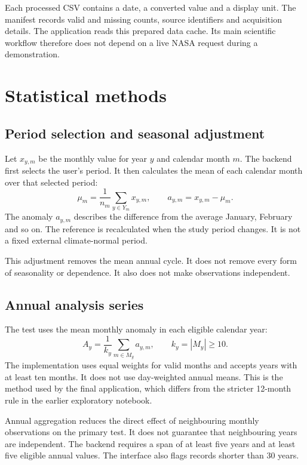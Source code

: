 \documentclass[10pt,a4paper,twocolumn]{article}
\begin{document}
Each processed CSV contains a date, a converted value and a display unit. The manifest records valid and missing counts, source identifiers and acquisition details. The application reads this prepared data cache. Its main scientific workflow therefore does not depend on a live NASA request during a demonstration.

\section{Statistical methods}
\subsection{Period selection and seasonal adjustment}
Let $x_{y,m}$ be the monthly value for year $y$ and calendar month $m$. The backend first selects the user's period. It then calculates the mean of each calendar month over that selected period:
\begin{equation}
\mu_m=\frac{1}{n_m}\sum_{y\in Y_m}x_{y,m},
\qquad a_{y,m}=x_{y,m}-\mu_m.
\label{eq:anomaly}
\end{equation}
The anomaly $a_{y,m}$ describes the difference from the average January, February and so on. The reference is recalculated when the study period changes. It is not a fixed external climate-normal period.

This adjustment removes the mean annual cycle. It does not remove every form of seasonality or dependence. It also does not make observations independent.

\subsection{Annual analysis series}
The test uses the mean monthly anomaly in each eligible calendar year:
\begin{equation}
A_y=\frac{1}{k_y}\sum_{m\in M_y}a_{y,m},
\qquad k_y=|M_y|\geq10.
\label{eq:annual}
\end{equation}
The implementation uses equal weights for valid months and accepts years with at least ten months. It does not use day-weighted annual means. This is the method used by the final application, which differs from the stricter 12-month rule in the earlier exploratory notebook.

Annual aggregation reduces the direct effect of neighbouring monthly observations on the primary test. It does not guarantee that neighbouring years are independent. The backend requires a span of at least five years and at least five eligible annual values. The interface also flags records shorter than 30 years.
\end{document}
